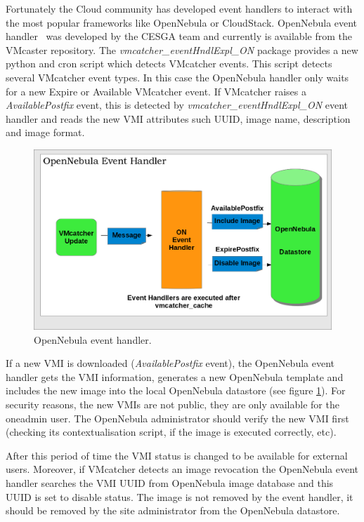 \documentclass{cai}
\begin{document}
Fortunately the Cloud community has developed event handlers to interact with the most popular frameworks like OpenNebula or CloudStack.
OpenNebula event handler~\cite{onevent} was developed by the CESGA team and currently is available from the VMcaster repository. 
The \textit{vmcatcher\_eventHndlExpl\_ON} package provides a new python and cron script which detects VMcatcher events. 
This script detects several VMcatcher event types. In this case the OpenNebula handler only waits for a new Expire or Available VMcatcher event.
If VMcatcher raises a \textit{AvailablePostfix} event, this is detected by \textit{vmcatcher\_eventHndlExpl\_ON} event handler and reads the new VMI attributes such UUID, image name, description and image format.

\begin{figure}
\centering
\includegraphics[width=1\textwidth]{ONeventhandler.png}
\caption{OpenNebula event handler.}
\label{fig:onevent}
\end{figure}

If a new VMI is downloaded (\textit{AvailablePostfix} event), the OpenNebula event handler gets the VMI information, generates a new OpenNebula template and includes the new image into the local OpenNebula datastore (see figure \ref{fig:onevent}). 
For security reasons, the new VMIs are not public, they are only available for the oneadmin user. The OpenNebula administrator should verify the new VMI first (checking its contextualisation script, if the image is executed correctly, etc).

After this period of time the VMI status is changed to be available for external users. 
Moreover, if VMcatcher detects an image revocation the OpenNebula event handler searches the VMI UUID from OpenNebula image database and this UUID is set to disable status.
The image is not removed by the event handler, it should be removed by the site administrator from the OpenNebula datastore.
\end{document}
